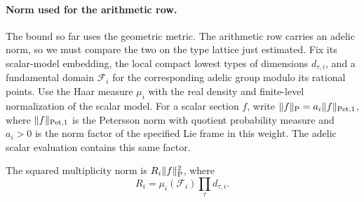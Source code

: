 \paragraph{Norm used for the arithmetic row.}
The bound so far uses the geometric metric. The arithmetic row carries an adelic norm,
so we must compare the two on the type lattice just estimated. Fix its scalar-model embedding, the local
compact lowest types of dimensions \(d_{\tau,i}\), and a
fundamental domain \(\mathcal F_i\) for the corresponding
adelic group modulo its rational points. Use the Haar measure
\(\mu_i\) with the real density and finite-level normalization
of the scalar model. For a scalar section \(f\), write
\(\|f\|_{\rm P}=a_i\|f\|_{{\rm Pet},1}\), where
\(\|f\|_{{\rm Pet},1}\) is the Petersson norm with quotient
probability measure and \(a_i>0\) is the norm factor of the
specified Lie frame in this weight. The adelic scalar evaluation contains this same factor.
\begin{lemma}\label{lem:covolume-type-metric}
The squared multiplicity norm is \(R_i\|f\|_{\rm P}^2\), where
\[
            R_i=\mu_i(\mathcal F_i)\prod_\tau d_{\tau,i}.
\]
\end{lemma}
